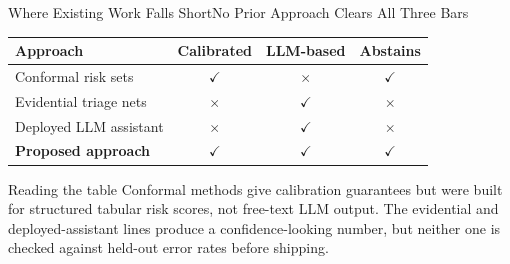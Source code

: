 \begin{frame}{Where Existing Work Falls Short}{No Prior Approach Clears All Three Bars}
  \begin{table}
    \centering
    \small
    \begin{tabular}{lccc}
      \toprule
      \textbf{Approach} & \textbf{Calibrated} & \textbf{LLM-based} & \textbf{Abstains} \\
      \midrule
      Conformal risk sets \cite{reyes2021conformal} & $\checkmark$ & $\times$ & $\checkmark$ \\
      Evidential triage nets \cite{park2023hallucination} & $\times$ & $\checkmark$ & $\times$ \\
      Deployed LLM assistant \cite{voss2024llmtriage} & $\times$ & $\checkmark$ & $\times$ \\
      \midrule
      \rowcolor{teal!14}
      \textbf{Proposed approach} & $\checkmark$ & $\checkmark$ & $\checkmark$ \\
      \bottomrule
    \end{tabular}
  \end{table}
  \par\vspace{8pt}
  \begin{notebox}{Reading the table}
    \footnotesize
    Conformal methods give calibration guarantees but were built for
    structured tabular risk scores, not free-text LLM output. The
    evidential and deployed-assistant lines produce a confidence-looking
    number, but neither one is checked against held-out error rates
    before shipping.
  \end{notebox}
\end{frame}

